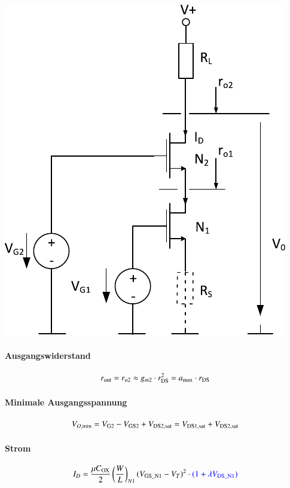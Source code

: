 \begin{minipage}[t]{0.3\columnwidth}
    \includegraphics[width=\columnwidth, align=t]{images/05_stromquelle_kaskode.pdf}
\end{minipage}
\hfill
\begin{minipage}[t]{0.65\columnwidth}
    \paragraph{Ausgangswiderstand}

    \vspace{-0.2cm}
    \[
        r_{\rm out} = r_{\rm o2} \approx g_{m2} \cdot r_{\rm DS}^2 = a_{\rm max} \cdot r_{\rm DS}
    \]
            

    \paragraph{Minimale Ausgangsspannung}

    \vspace{-0.5cm}
    \[
        V_{O, \rm min} = V_{\rm G2} - V_{\rm GS2} + V_{\rm DS2, sat} =  V_{\rm DS1, sat} + V_{\rm DS2, sat}
    \]


    \paragraph{Strom}

    \vspace{-0.4cm}
    \[
        I_D = \frac{\mu C_{\rm OX}}{2} \left( \frac{W}{L}\right)_{N1} (V_{\rm GS\_N1} - V_T)^2 \cdot {\color{blue}(1 + \lambda V_{\rm DS\_N1})}
    \]
\end{minipage}


